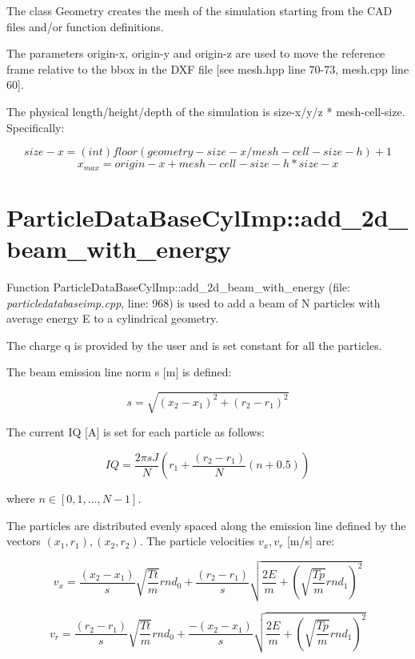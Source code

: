 \documentclass[12pt,a4paper]{article}
\begin{document}
The class Geometry creates the mesh of the simulation starting from the CAD files and/or function definitions.

The parameters origin-x, origin-y and origin-z are used to move the reference frame relative to the bbox in the DXF file [see mesh.hpp line 70-73, mesh.cpp line 60].

The physical length/height/depth of the simulation is size-x/y/z * mesh-cell-size. Specifically:

$$size-x = (int)floor(geometry-size-x / mesh-cell-size-h) + 1 $$
$$x_{max} = origin-x + mesh-cell-size-h * size-x$$







\section{ParticleDataBaseCylImp::add\_2d\_beam\_with\_energy}

Function ParticleDataBaseCylImp::add\_2d\_beam\_with\_energy (file: \textit{particledatabaseimp.cpp}, line: 968) is used to add a beam of N particles with average energy E to a cylindrical geometry.

The charge q is provided by the user and is set constant for all the particles.

The beam emission line norm s [m] is defined:

\begin{equation}
	s = \sqrt{(x_{2}-x_{1})^2+(r_{2}-r_{1})^2}
\end{equation}

The current IQ [A] is set for each particle as follows:

\begin{equation}
	IQ =\frac{2\pi sJ}{N}(r_{1} + \frac{(r_{2}-r_{1})}{N}(n+0.5))
\end{equation}

where $n\in[0,1,...,N-1]$. 

The particles are distributed evenly spaced along the emission line defined by the vectors $(x_{1},r_{1}), (x_{2},r_{2})$. The particle velocities $v_{x},v_{r}$ [m/s] are:

\begin{equation}
	v_{x}=\frac{(x_{2}-x_{1})}{s}\sqrt{\frac{Tt}{m}}rnd_{0}+\frac{(r_{2}-r_{1})}{s}\sqrt{\frac{2E}{m}+(\sqrt{\frac{Tp}{m}}rnd_{1})^2}
\end{equation}

\begin{equation}
	v_{r}=\frac{(r_{2}-r_{1})}{s}\sqrt{\frac{Tt}{m}}rnd_{0}+\frac{-(x_{2}-x_{1})}{s}\sqrt{\frac{2E}{m}+(\sqrt{\frac{Tp}{m}}rnd_{1})^2} 
\end{equation}
\end{document}

